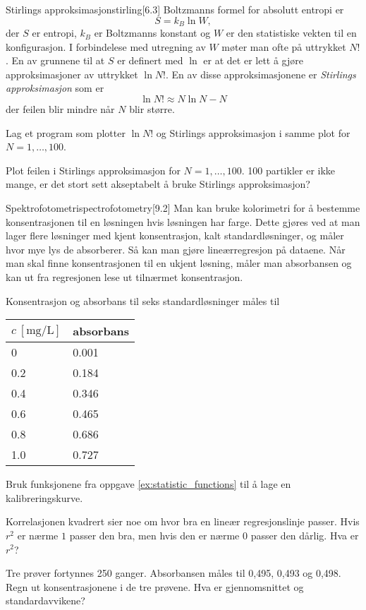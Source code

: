 \begin{exercise}{Stirlings approksimasjon}{stirling}[6.3]
	Boltzmanns formel for absolutt entropi er
	\begin{equation*}
	S = k_B\ln W,
	\end{equation*}
	der $S$ er entropi, $k_B$ er Boltzmanns konstant og $W$ er den statistiske vekten til en konfigurasjon. I forbindelese med utregning av $W$ møter man ofte på uttrykket $N!$. En av grunnene til at $S$ er definert med $\ln$ er at det er lett å gjøre approksimasjoner av uttrykket $\ln N!$. En av disse approksimasjonene er \emph{Stirlings approksimasjon} som er
	\begin{equation*}
	\ln N! \approx N \ln N -N
	\end{equation*}
	der feilen blir mindre når $N$ blir større.
	
	\subexercise Lag et program som plotter $\ln N!$ og Stirlings approksimasjon i samme plot for $N=1,\ldots,100$.
	
	\subexercise Plot feilen i Stirlings approksimasjon for $N=1,\ldots,100$. 100 partikler er ikke mange, er det stort sett akseptabelt å bruke Stirlings approksimasjon?
\end{exercise}

\begin{exercise}{Spektrofotometri}{spectrofotometry}[9.2]
	Man kan bruke kolorimetri for å bestemme konsentrasjonen til en løsningen hvis løsningen har farge. Dette gjøres ved at man lager flere løsninger med kjent konsentrasjon, kalt standardløsninger, og måler hvor mye lys de absorberer. Så kan man gjøre lineærregresjon på dataene. Når man skal finne konsentrasjonen til en ukjent løsning, måler man absorbansen og kan ut fra regresjonen lese ut tilnærmet konsentrasjon.
	
	Konsentrasjon og absorbans til seks standardløsninger måles til
	
	{\renewcommand{\arraystretch}{1.2}
		\centering
		\begin{tabular}{ll}
			\toprule $c\ \left[ \si{\milli\gram\per\liter} \right]$ & absorbans \\ 
			\midrule 0 & 0.001 \\ 
			0.2 & 0.184 \\ 
			0.4 & 0.346 \\ 
			0.6 & 0.465 \\ 
			0.8 & 0.686 \\ 
			1.0 & 0.727 \\ 
			\bottomrule
		\end{tabular}\par
	}
	
	\subexercise Bruk funksjonene fra oppgave \ref{ex:statistic_functions} til å lage en kalibreringskurve.
	
	\subexercise Korrelasjonen kvadrert sier noe om hvor bra en lineær regresjonslinje passer. Hvis $r^2$ er nærme $1$ passer den bra, men hvis den er nærme $0$ passer den dårlig. Hva er $r^2$?
	
	\subexercise Tre prøver fortynnes 250 ganger. Absorbansen måles til 0,495, 0,493 og 0,498. Regn ut konsentrasjonene i de tre prøvene. Hva er gjennomsnittet og standardavvikene?
\end{exercise}

